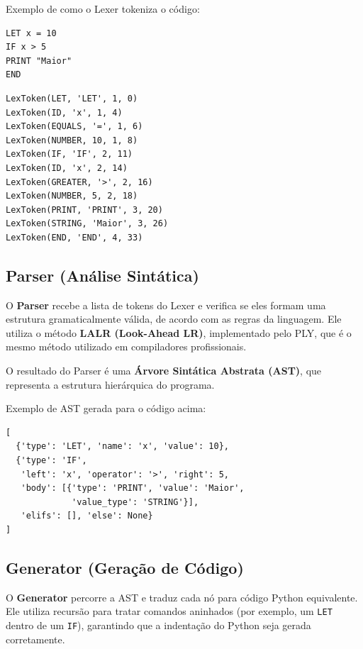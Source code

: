 \documentclass[12pt, a4paper]{article}
\begin{document}
Exemplo de como o Lexer tokeniza o código:

\begin{lstlisting}[style=minilang, caption={Entrada no Lexer}]
LET x = 10
IF x > 5
PRINT "Maior"
END
\end{lstlisting}

\begin{lstlisting}[style=python, caption={Tokens gerados pelo Lexer}]
LexToken(LET, 'LET', 1, 0)
LexToken(ID, 'x', 1, 4)
LexToken(EQUALS, '=', 1, 6)
LexToken(NUMBER, 10, 1, 8)
LexToken(IF, 'IF', 2, 11)
LexToken(ID, 'x', 2, 14)
LexToken(GREATER, '>', 2, 16)
LexToken(NUMBER, 5, 2, 18)
LexToken(PRINT, 'PRINT', 3, 20)
LexToken(STRING, 'Maior', 3, 26)
LexToken(END, 'END', 4, 33)
\end{lstlisting}

\subsection{Parser (Análise Sintática)}

O \textbf{Parser} recebe a lista de tokens do Lexer e verifica se eles formam uma estrutura
gramaticalmente válida, de acordo com as regras da linguagem. Ele utiliza o método
\textbf{LALR (Look-Ahead LR)}, implementado pelo PLY, que é o mesmo método utilizado
em compiladores profissionais.

O resultado do Parser é uma \textbf{Árvore Sintática Abstrata (AST)}, que representa
a estrutura hierárquica do programa.

Exemplo de AST gerada para o código acima:

\begin{lstlisting}[style=python, caption={AST gerada pelo Parser}]
[
  {'type': 'LET', 'name': 'x', 'value': 10},
  {'type': 'IF',
   'left': 'x', 'operator': '>', 'right': 5,
   'body': [{'type': 'PRINT', 'value': 'Maior',
             'value_type': 'STRING'}],
   'elifs': [], 'else': None}
]
\end{lstlisting}

\subsection{Generator (Geração de Código)}

O \textbf{Generator} percorre a AST e traduz cada nó para código Python equivalente.
Ele utiliza recursão para tratar comandos aninhados (por exemplo, um \texttt{LET}
dentro de um \texttt{IF}), garantindo que a indentação do Python seja gerada corretamente.
\end{document}

